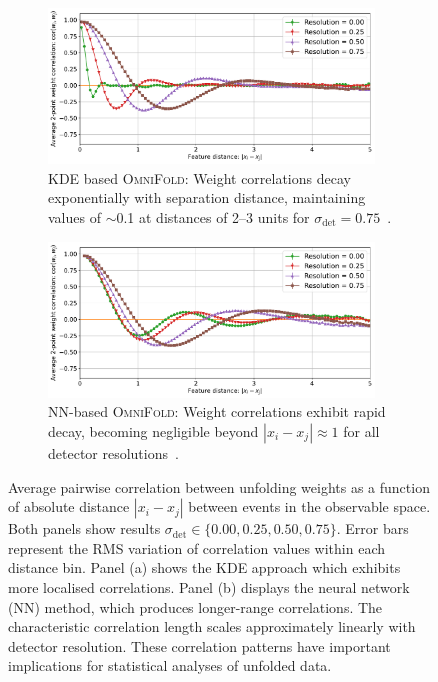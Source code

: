 \begin{figure}
    \centering
    \setcounter{footnote}{18}  %
    \begin{subfigure}[t]{\textwidth}
        \centering
        \includegraphics[width=0.95\textwidth]{figures/chapter-07/weight-correlation-vs-distance-1d-set1.pdf}
        \caption{KDE based \textsc{OmniFold}: Weight correlations decay exponentially with separation distance, maintaining values of $\sim$0.1 at distances of 2--3 units for $\sigma_{\text{det}} = 0.75$~\cite{Desai:2025mpy}.\footnotemark}
        \label{fig:weight-corr-kde}
    \end{subfigure}
    \begin{subfigure}[t]{\textwidth}
        \centering
        \includegraphics[width=0.95\textwidth]{figures/chapter-07/weight-correlation-vs-distance-1d-set2.pdf}
        \caption{NN-based \textsc{OmniFold}: Weight correlations exhibit rapid decay, becoming negligible beyond $|x_i - x_j| \approx 1$ for all detector resolutions~\cite{Desai:2025mpy}.\footnotemark}
        \label{fig:weight-corr-nn}
    \end{subfigure}
    \caption[Event wise weight correlations as a function of separation distance for different unfolding methods.]{Average pairwise correlation between unfolding weights as a function of absolute distance $|x_i - x_j|$ between events in the observable space. Both panels show results $\sigma_{\text{det}} \in \{0.00, 0.25, 0.50, 0.75\}$. Error bars represent the RMS variation of correlation values within each distance bin. Panel (a) shows the KDE approach which exhibits more localised correlations. Panel (b) displays the neural network (NN) method, which produces longer-range correlations. The characteristic correlation length scales approximately linearly with detector resolution. These correlation patterns have important implications for statistical analyses of unfolded data.
    }
    \label{fig:weight-correlation-vs-distance-1d}
\end{figure}
